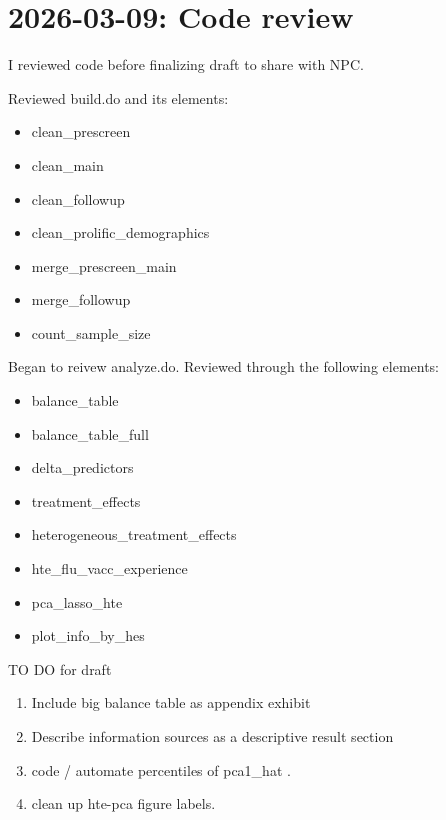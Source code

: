 
\section{2026-03-09: Code review}

I reviewed code before finalizing draft to share with NPC. 

Reviewed build.do and its elements:
\begin{itemize}
    \item clean\_prescreen
    \item clean\_main
    \item clean\_followup
    \item clean\_prolific\_demographics
    \item merge\_prescreen\_main 
    \item merge\_followup 
    \item count\_sample\_size 
\end{itemize}
Began to reivew analyze.do. Reviewed through the following elements:
\begin{itemize}
    \item balance\_table 
    \item balance\_table\_full 
    \item delta\_predictors
    \item treatment\_effects
    \item heterogeneous\_treatment\_effects
    \item hte\_flu\_vacc\_experience
    \item pca\_lasso\_hte 
    \item plot\_info\_by\_hes 
\end{itemize}



TO DO for draft
\begin{enumerate} 
    \item Include big balance table as appendix exhibit
    \item Describe information sources as a descriptive result section 
    \item code / automate percentiles of pca1\_hat . 
    \item clean up hte-pca figure labels.
\end{enumerate}